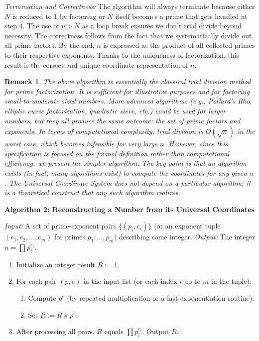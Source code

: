\documentclass[11pt]{article}
\newtheorem{remark}{Remark}
\begin{document}
\noindent\textit{Termination and Correctness:} The algorithm will always terminate because either $N$ is reduced to $1$ by factoring or $N$ itself becomes a prime that gets handled at step 4. The use of $p > N$ as a loop break ensures we don't trial divide beyond necessity. The correctness follows from the fact that we systematically divide out all prime factors. By the end, $n$ is expressed as the product of all collected primes to their respective exponents. Thanks to the uniqueness of factorization, this result is the correct and unique coordinate representation of $n$.

\begin{remark}
The above algorithm is essentially the classical \emph{trial division} method for prime factorization. It is sufficient for illustrative purposes and for factoring small-to-moderate sized numbers. More advanced algorithms (e.g., Pollard's Rho, elliptic curve factorization, quadratic sieve, etc.) could be used for larger numbers, but they all produce the same outcome: the set of prime factors and exponents. In terms of computational complexity, trial division is $O(\sqrt{n})$ in the worst case, which becomes infeasible for very large $n$. However, since this specification is focused on the formal definition rather than computational efficiency, we present the simpler algorithm. The key point is that an algorithm \emph{exists} (in fact, many algorithms exist) to compute the coordinates for any given $n$. The Universal Coordinate System does not depend on a particular algorithm; it is a theoretical construct that any such algorithm realizes.
\end{remark}

\noindent\textbf{Algorithm 2: Reconstructing a Number from its Universal Coordinates}

\noindent\textit{Input:} A set of prime-exponent pairs $\{(p_i, e_i)\}$ (or an exponent tuple $(e_1, e_2, \ldots, e_m)$ for primes $p_1,\dots,p_m$) describing some integer.  
\textit{Output:} The integer $n = \prod p_i^{e_i}$.

\begin{enumerate}[itemsep=0pt, topsep=4pt]
  \item Initialize an integer result $R := 1$.
  \item For each pair $(p, e)$ in the input list (or each index $i$ up to $m$ in the tuple):
  \begin{enumerate}
    \item Compute $p^e$ (by repeated multiplication or a fast exponentiation routine).
    \item Set $R := R \times p^e$.
  \end{enumerate}
  \item After processing all pairs, $R$ equals $\prod p_i^{e_i}$. Output $R$.
\end{enumerate}
\end{document}
